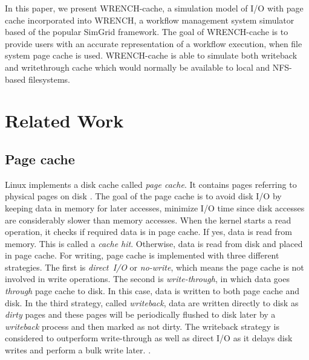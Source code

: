 \documentclass[conference]{IEEEtran}
\begin{document}
        In this paper, we present WRENCH-cache, a simulation model of I/O with page
        cache incorporated into WRENCH, a workflow management system simulator based of
        the popular SimGrid framework. The goal of WRENCH-cache is to provide users
        with an accurate representation of a workflow execution, when file system page
        cache is used. WRENCH-cache is able to simulate both writeback and writethrough
        cache which would normally be available to local and NFS-based filesystems.

    \section{Related Work}
    \label{relatedwork}
        
        \subsection{Page cache}
            
            Linux implements a disk cache called \textit{page cache}. 
            It contains pages referring to physical pages on disk \cite{linuxdev3rd2010}.
            The goal of the page cache is to avoid disk I/O by keeping data in memory 
            for later accesses, minimize I/O time since disk accesses are considerably 
            slower than memory accesses.
            When the kernel starts a read operation, it checks if required data is in page cache.
            If yes, data is read from memory. This is called a \textit{cache hit}. 
            Otherwise, data is read from disk and placed in page cache.
            For writing, page cache is implemented with three different strategies. 
            The first is \textit{direct~I/O} or \textit{no-write}, which means the page cache 
            is not involved in write operations. 
            The second is \textit{write-through}, in which data goes \textit{through} 
            page cache to disk. In this case, data is written to both page cache and disk. 
            In the third strategy, called \textit{writeback}, data are written directly 
            to disk as \textit{dirty} pages and these pages will be periodically flushed 
            to disk later by a \textit{writeback} process and then marked as not dirty. 
            The writeback strategy is considered to outperform write-through as well as 
            direct I/O as it delays disk writes and perform a bulk write later.
            \cite{linuxdev3rd2010}. 
            
\end{document}

